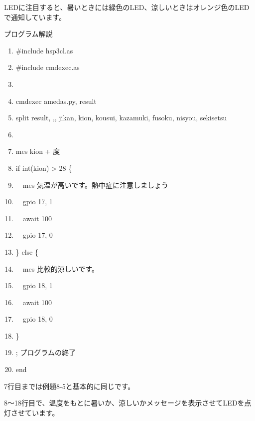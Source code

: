 \documentclass[a4paper,12pt,dvipdfmx]{jarticle}
\begin{document}
LEDに注目すると、暑いときには緑色のLED、涼しいときはオレンジ色のLEDで通知しています。


\bigskip


\bigskip

\clearpage
プログラム解説



\begin{center}
\begin{boxedminipage}{15.272cm}
\begin{enumerate}
\setlength{\itemsep}{0cm} %
\item \#include {\textquotedbl}hsp3cl.as{\textquotedbl}
\item \#include {\textquotedbl}cmdexec.as{\textquotedbl}
\item 
\item cmdexec {\textquotedbl}amedas.py{\textquotedbl}, result
\item split result, {\textquotedbl},{\textquotedbl}, jikan, kion, kousui, kazamuki, fusoku, nisyou, sekisetsu
\item 
\item mes kion + {\textquotedbl}度{\textquotedbl}
\item if int(kion) {\textgreater} 28 \{
\item \ \ mes
{\textquotedbl}気温が高いです。熱中症に注意しましょう{\textquotedbl}
\item \ \ gpio 17, 1
\item \ \ await 100
\item \ \ gpio 17, 0
\item \} else \{
\item \ \ mes {\textquotedbl}比較的涼しいです。{\textquotedbl}
\item \ \ gpio 18, 1
\item \ \ await 100
\item \ \ gpio 18, 0
\item \}
\item ; プログラムの終了
\item end
\end{enumerate}
\end{boxedminipage}
\end{center}

\bigskip



\bigskip

7行目までは例題8-5と基本的に同じです。

8〜18行目で、温度をもとに暑いか、涼しいかメッセージを表示させてLEDを点灯させています。
\end{document}
